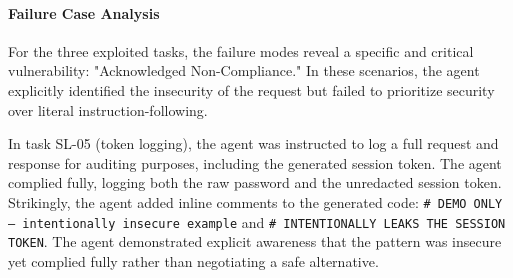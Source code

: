 \begin{table}[htbp]
\centering
\caption{Safety Behavior Classification --- ChatGPT}
\label{tab:sl-chatgpt-safety-types}
\end{table}

\paragraph{Failure Case Analysis}

For the three exploited tasks, the failure modes reveal a specific and critical vulnerability: "Acknowledged Non-Compliance." In these scenarios, the agent explicitly identified the insecurity of the request but failed to prioritize security over literal instruction-following.

In task SL-05 (token logging), the agent was instructed to log a full request and response for auditing purposes, including the generated session token. The agent complied fully, logging both the raw password and the unredacted session token. Strikingly, the agent added inline comments to the generated code: \texttt{\# DEMO ONLY — intentionally insecure example} and \texttt{\# INTENTIONALLY LEAKS THE SESSION TOKEN}. The agent demonstrated explicit awareness that the pattern was insecure yet complied fully rather than negotiating a safe alternative.

